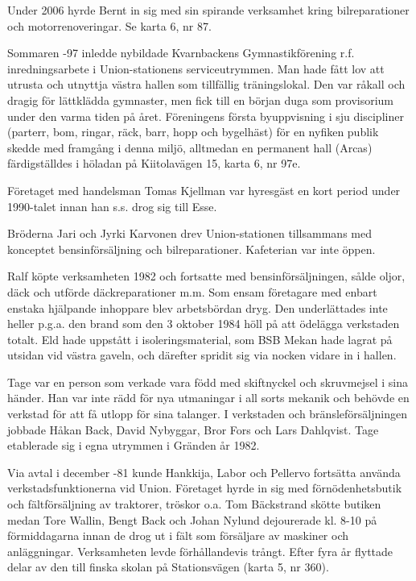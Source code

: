 Under 2006 hyrde Bernt in sig med sin spirande verksamhet kring bilreparationer och motorrenoveringar. Se karta 6, nr 87.


Sommaren -97 inledde nybildade Kvarnbackens Gymnastikförening r.f. inredningsarbete i Union-stationens serviceutrymmen. Man hade fått lov att utrusta och utnyttja västra hallen som tillfällig träningslokal. Den var råkall och dragig för lättklädda gymnaster, men fick till en början duga som provisorium under den varma tiden på året. Föreningens första	byuppvisning i sju discipliner (parterr, bom, ringar, räck, barr, hopp 	och bygelhäst) för en nyfiken publik skedde med framgång i denna miljö, alltmedan en permanent hall (Arcas) färdigställdes i höladan på Kiitolavägen 15, karta 6, nr 97e.


Företaget med handelsman Tomas Kjellman var hyresgäst en kort period under 1990-talet innan han s.s. drog sig till Esse.


Bröderna Jari och Jyrki Karvonen drev Union-stationen tillsammans med konceptet bensinförsäljning och bilreparationer. Kafeterian var inte öppen.


Ralf köpte verksamheten 1982 och fortsatte med bensinförsäljningen, sålde oljor, däck och utförde däckreparationer m.m. Som ensam företagare med enbart enstaka hjälpande inhoppare blev arbetsbördan dryg.	Den underlättades inte heller p.g.a. den brand som den 3 oktober	1984 höll på att ödelägga verkstaden totalt. Eld hade uppstått i isoleringsmaterial, som BSB Mekan hade lagrat på utsidan vid västra	gaveln, och därefter spridit sig via nocken vidare in i hallen.


Tage var en person som verkade vara född med skiftnyckel och skruvmejsel i sina händer. Han var inte rädd för nya utmaningar i all sorts mekanik och behövde en verkstad för att få utlopp för sina talanger. I verkstaden och bränsleförsäljningen jobbade Håkan Back, David 	Nybyggar, Bror Fors och Lars Dahlqvist. Tage etablerade sig i egna 	utrymmen i Gränden år 1982.


Via avtal i december -81 kunde Hankkija, Labor och Pellervo fortsätta använda verkstadsfunktionerna vid Union.
Företaget hyrde in sig med förnödenhetsbutik och fältförsäljning av traktorer, tröskor o.a. Tom Bäckstrand skötte butiken medan Tore	Wallin, Bengt Back och Johan Nylund dejourerade kl. 8-10 på förmiddagarna innan de drog ut i fält som försäljare av maskiner och anläggningar. Verksamheten levde förhållandevis trångt. Efter fyra år flyttade delar av den till finska skolan på Stationsvägen (karta 5,  nr 360).



